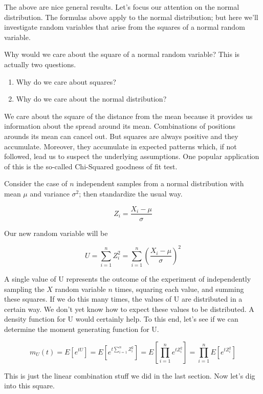 \documentclass[]{article}
\begin{document}
The above are nice general results.  Let's focus our attention
on the normal distribution.  The formulas above apply to
the normal distribution; but here we'll investigate random
variables that arise from the squares of a normal random
variable.

Why would we care about the square of a normal random
variable?  This is actually two questions.

\begin{enumerate}
\item Why do we care about squares?
\item Why do we care about the normal distribution?
\end{enumerate}

We care about the square of the distance from the mean
because it provides us information about the
spread around its mean.  Combinations of
positions arounds its mean can cancel out.
But squares are always positive and they accumulate.
Moreover, they accumulate in expected
patterns which, if not followed, lead us to suspect the
underlying assumptions.
One popular application of this is the so-called Chi-Squared
goodness of fit test.

Consider the case of $n$ independent samples from a normal
distribution with mean $\mu$ and variance $\sigma^2$; then
standardize the usual way.

$$
Z_i = \frac{X_i - \mu}{\sigma}
$$

Our new random variable will be

$$
U = \sum_{i=1}^n Z_i^2 = \sum_{i=1}^n \left( 
    \frac{X_i - \mu}{\sigma} \right)^2
$$

A single value of U represents the outcome of the experiment
of independently sampling the $X$ random variable $n$ times,
squaring each value, and summing these squares.  If we do
this many times, the values of U are distributed in a certain
way.  We don't yet know how to expect these values to be
distributed.  A density function for U would certainly help.
To this end, let's see if we can determine the moment
generating function for U.

\begin{equation}
m_U(t) = E \left[ e^{tU} \right]
 = E \left[ e^{t \sum_{i=1}^n Z_i^2} \right]
 = E \left[ \prod_{i=1}^n e^{t Z_i^2} \right]
 = \prod_{i=1}^n E \left[ e^{t Z_i^2} \right] \label{norm_sq1}
\end{equation}

This is just the linear combination stuff we did in the
last section.  Now let's dig into this square.
\end{document}
